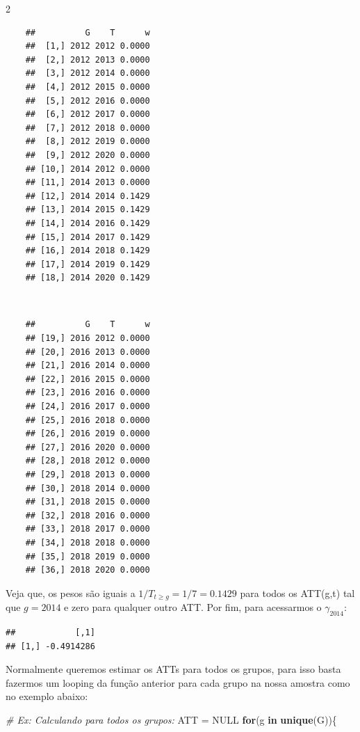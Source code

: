 \documentclass[portugues]{article}
\newenvironment{Shaded}{\begin{snugshade}}{\end{snugshade}}
\newcommand{\CommentTok}[1]{\textcolor[rgb]{0.56,0.35,0.01}{\textit{#1}}}
\newcommand{\ConstantTok}[1]{\textcolor[rgb]{0.56,0.35,0.01}{#1}}
\newcommand{\ControlFlowTok}[1]{\textcolor[rgb]{0.13,0.29,0.53}{\textbf{#1}}}
\newcommand{\FunctionTok}[1]{\textcolor[rgb]{0.13,0.29,0.53}{\textbf{#1}}}
\newcommand{\NormalTok}[1]{#1}
\newcommand{\OtherTok}[1]{\textcolor[rgb]{0.56,0.35,0.01}{#1}}
\newcommand{\SpecialCharTok}[1]{\textcolor[rgb]{0.81,0.36,0.00}{\textbf{#1}}}
\begin{document}
\begin{box_code}
\begin{multicols}{2}
    \centering
    \begin{verbatim}
    ##          G    T      w
    ##  [1,] 2012 2012 0.0000
    ##  [2,] 2012 2013 0.0000
    ##  [3,] 2012 2014 0.0000
    ##  [4,] 2012 2015 0.0000
    ##  [5,] 2012 2016 0.0000
    ##  [6,] 2012 2017 0.0000
    ##  [7,] 2012 2018 0.0000
    ##  [8,] 2012 2019 0.0000
    ##  [9,] 2012 2020 0.0000
    ## [10,] 2014 2012 0.0000
    ## [11,] 2014 2013 0.0000
    ## [12,] 2014 2014 0.1429
    ## [13,] 2014 2015 0.1429
    ## [14,] 2014 2016 0.1429
    ## [15,] 2014 2017 0.1429
    ## [16,] 2014 2018 0.1429
    ## [17,] 2014 2019 0.1429
    ## [18,] 2014 2020 0.1429
    \end{verbatim}
    \\
    \begin{verbatim}
    ##          G    T      w
    ## [19,] 2016 2012 0.0000
    ## [20,] 2016 2013 0.0000
    ## [21,] 2016 2014 0.0000
    ## [22,] 2016 2015 0.0000
    ## [23,] 2016 2016 0.0000
    ## [24,] 2016 2017 0.0000
    ## [25,] 2016 2018 0.0000
    ## [26,] 2016 2019 0.0000
    ## [27,] 2016 2020 0.0000
    ## [28,] 2018 2012 0.0000
    ## [29,] 2018 2013 0.0000
    ## [30,] 2018 2014 0.0000
    ## [31,] 2018 2015 0.0000
    ## [32,] 2018 2016 0.0000
    ## [33,] 2018 2017 0.0000
    ## [34,] 2018 2018 0.0000
    ## [35,] 2018 2019 0.0000
    ## [36,] 2018 2020 0.0000
    \end{verbatim}
\end{multicols}

\begin{Shaded}
\end{Shaded}

Veja que, os pesos são iguais a $1/T_{t \geq g} = 1/7 = 0.1429$ para todos os ATT(g,t) tal que $g=2014$ e zero para qualquer outro ATT. Por fim, para acessarmos o $\gamma_{2014}$:

\begin{verbatim}
##            [,1]
## [1,] -0.4914286
\end{verbatim}

Normalmente queremos estimar os ATTs para todos os grupos, para isso basta fazermos um looping da função anterior para cada grupo na nossa amostra como no exemplo abaixo:

\begin{Shaded}
\begin{Highlighting}[]
\CommentTok{\# Ex: Calculando para todos os grupos:}
\NormalTok{ATT }\OtherTok{=} \ConstantTok{NULL}
\ControlFlowTok{for}\NormalTok{(g }\ControlFlowTok{in} \FunctionTok{unique}\NormalTok{(G))\{}
  

\end{Highlighting}
\end{Shaded}
\end{box_code}
\end{document}
